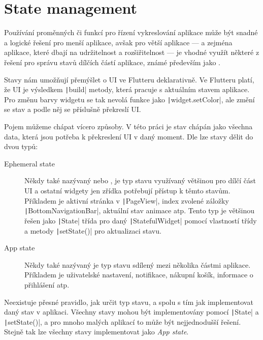\section{State management}

Používání proměnných či funkcí pro řízení vykreslování aplikace může být
snadné a logické řešení pro menší aplikace,
avšak pro větší aplikace
--- a zejména aplikace, které dbají na udržitelnost a rozšiřitelnost ---
je vhodné využít některé z řešení pro správu stavů dílčích částí aplikace,
známé především jako .
 
Stavy nám umožňují přemýšlet o UI ve Flutteru deklarativně.
Ve Flutteru platí,
že UI je výsledkem \texttt|build| metody,
která pracuje s aktuálním stavem aplikace.
Pro změnu barvy widgetu se tak nevolá funkce jako
\texttt|widget.setColor|,
ale změní se stav a podle něj se příslušně překreslí UI.
\cite{flutter_state_mgmt_declarative}

Pojem  můžeme chápat vícero způsoby.
V této práci je stav chápán jako všechna data,
která jsou potřeba k překreslení UI v daný moment.
Dle \cite{flutter_state_mgmt_ephemeral_vs_app} lze stavy dělit do dvou typů:

\begin{description}
    \item[Ephemeral state] Někdy také nazývaný  nebo
,
je typ stavu využívaný většinou pro dílčí část UI
a ostatní widgety jen zřídka potřebují přístup k těmto stavům.
Příkladem je aktivní stránka v \texttt|PageView|,
index zvolené záložky \texttt|BottomNavigationBar|,
aktuální stav animace atp.
Tento typ je většinou řešen jako \texttt|State| třída pro daný
\texttt|StatefulWidget| pomocí vlastností třídy a metody
\texttt|setState()| pro aktualizaci stavu.
    \item[App state] Někdy také nazývaný  je typ stavu
sdílený mezi několika částmi aplikace.
Příkladem je uživatelské nastavení, notifikace, nákupní košík,
informace o přihlášení atp.
\end{description}

Neexistuje přesné pravidlo,
jak určit typ stavu,
a spolu s tím jak implementovat daný stav v aplikaci.
Všechny stavy mohou být implementovány pomocí \texttt|State| a
\texttt|setState()|,
a pro mnoho malých aplikací to může být nejjednodušší řešení.
Stejně tak lze všechny stavy implementovat jako \emph{App state}.

